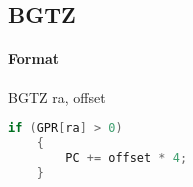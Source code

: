 \subsection{BGTZ}


\paragraph{Format} BGTZ ra, offset

\begin{lstlisting}[language=c]
    if (GPR[ra] > 0)
    {
        PC += offset * 4;
    }
\end{lstlisting}
